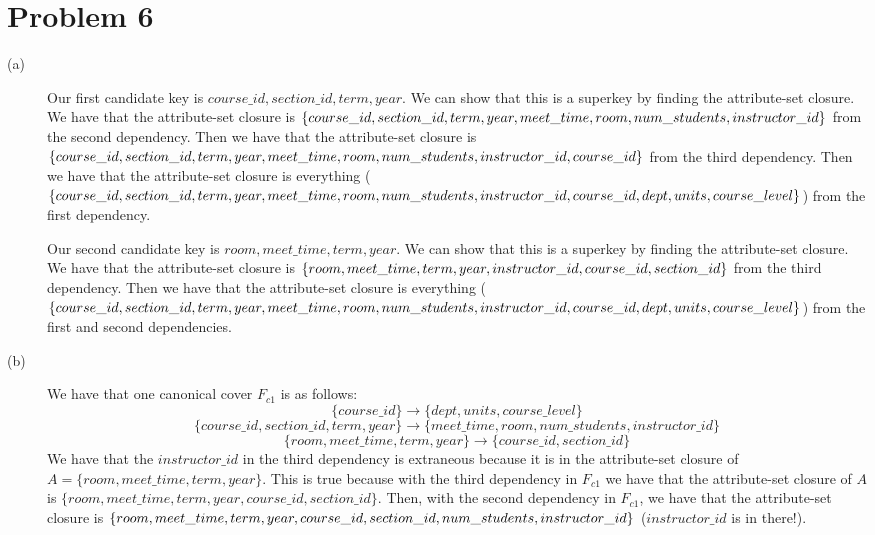 \documentclass{article}
\begin{document}
\section*{Problem 6}
\begin{description}
    \item[(a)] Our first candidate key is $course\_id, section\_id, term, year$.
        We can show that this is a superkey by finding the attribute-set closure.
        We have that the attribute-set closure is $\{course\_id, section\_id,
        term, \\ year, meet\_time, room, num\_students, instructor\_id\}$ from the
        second dependency. Then we have that the attribute-set closure is
        $\{course\_id, section\_id, term, year, meet\_time, room, num\_students, \\
        instructor\_id, course\_id\}$ from the third dependency. Then we have
        that the attribute-set closure is everything ($\{course\_id, section\_id,
        term, year, meet\_time, room, num\_students, instructor\_id, course\_id, \\
        dept, units, course\_level\}$) from the first dependency.

        Our second candidate key is $room, meet\_time, term, year$. We can show
        that this is a superkey by finding the attribute-set closure. We have
        that the attribute-set closure is $\{room, meet\_time, term, year, \\
        instructor\_id, course\_id, section\_id\}$ from the third dependency.
        Then we have that the attribute-set closure is
        everything ($\{course\_id, section\_id,
        term, year, meet\_time, room, num\_students, instructor\_id, \\ course\_id,
        dept, units, course\_level\}$) from the first and second dependencies.
    \item[(b)] We have that one canonical cover $F_{c1}$ is as follows:
        \[ \{ course\_id \} \rightarrow \{ dept, units, course\_level \} \]
        \[ \{ course\_id, section\_id, term, year \} \rightarrow
        \{ meet\_time, room, num\_students, instructor\_id \} \]
        \[ \{ room, meet\_time, term, year \} \rightarrow \{ course\_id,
        section\_id \} \]
        We have that the $instructor\_id$ in the third dependency is extraneous
        because it is in the attribute-set closure of $A = \{room, meet\_time,
        term, year\}$. This is true because with the third dependency in
        $F_{c1}$ we have that the attribute-set closure of $A$ is
        $\{room, meet\_time, term, year, course\_id, section\_id\}$. Then, with
        the second dependency in $F_{c1}$, we have that the attribute-set
        closure is $\{room, meet\_time, \\ term, year, course\_id, section\_id,
        num\_students, instructor\_id \}$ ($instructor\_id$ is in there!).


\end{description}
\end{document}
